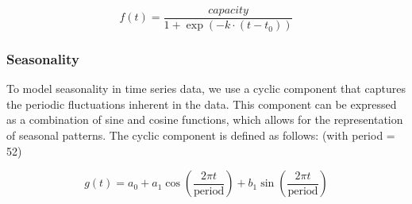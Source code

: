 \documentclass{article}
\begin{document}
\[
f(t) = \frac{capacity}{1 + \exp(-k \cdot (t - t_0))}
\]



\subsubsection{Seasonality}

\noindent
To model seasonality in time series data, we use a cyclic component that captures the periodic fluctuations inherent in the data. This component can be expressed as a combination of sine and cosine functions, which allows for the representation of seasonal patterns. The cyclic component is defined as follows:
(with period = 52)

\[
g(t) = a_0 + a_1 \cos\left(\frac{2 \pi t}{\text{period}}\right) + b_1 \sin\left(\frac{2 \pi t}{\text{period}}\right)
\]

\end{document}
